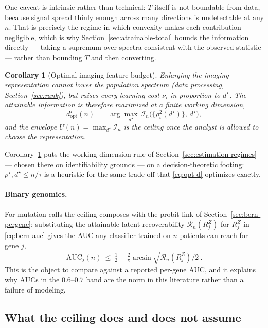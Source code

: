 \documentclass{article}
\newtheorem{corollary}{Corollary}
\begin{document}
One caveat is intrinsic rather than technical: $T$ itself is not boundable from
data, because signal spread thinly enough across many directions is undetectable
at any $n$. That is precisely the regime in which convexity makes each
contribution negligible, which is why Section~\ref{sec:attainable-total} bounds
the information directly --- taking a supremum over spectra consistent with the
observed statistic --- rather than bounding $T$ and then converting.

\begin{corollary}[Optimal imaging feature budget]
\label{cor:optimal-d}
Enlarging the imaging representation cannot lower the population spectrum
(data processing, Section~\ref{sec:rank}), but raises every learning cost
$\nu_i$ in proportion to $d^\star$. The attainable information is therefore
maximized at a finite working dimension,
\begin{equation}
d^\star_{\mathrm{opt}}(n) \;=\; \arg\max_{d^\star}\ \mathcal{I}_n\big(\{\rho_i^2(d^\star)\},\,d^\star\big),
\label{eq:opt-d}
\end{equation}
and the envelope $U(n)=\max_{d^\star}\mathcal{I}_n$ is the ceiling once the
analyst is allowed to choose the representation.
\end{corollary}

Corollary~\ref{cor:optimal-d} puts the working-dimension rule of
Section~\ref{sec:estimation-regimes} --- chosen there on identifiability grounds
--- on a decision-theoretic footing: $p^\star,d^\star\le n/\tau$ is a heuristic
for the same trade-off that \eqref{eq:opt-d} optimizes exactly.

\paragraph{Binary genomics.} For mutation calls the ceiling composes with the
probit link of Section~\ref{sec:bern-pergene}: substituting the attainable
latent recoverability $\mathcal{R}_n(R_j^Z)$ for $R_j^Z$ in
\eqref{eq:bern-auc} gives the AUC any classifier trained on $n$ patients can
reach for gene $j$,
\begin{equation}
\mathrm{AUC}_j(n)\ \le\ \tfrac12+\tfrac{2}{\pi}\arcsin\!\sqrt{\mathcal{R}_n(R_j^Z)/2}\,.
\label{eq:attainable-auc}
\end{equation}
This is the object to compare against a reported per-gene AUC, and it explains
why AUCs in the $0.6$--$0.7$ band are the norm in this literature rather than a
failure of modeling.

\subsection{What the ceiling does and does not assume}
\label{sec:attainable-caveats}
\end{document}
